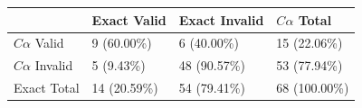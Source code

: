 \begin{tabular}{llll}
\toprule
 & Exact Valid & Exact Invalid & $C\alpha$ Total \\
\midrule
$C\alpha$ Valid & 9 (60.00\%) & 6 (40.00\%) & 15 (22.06\%) \\
$C\alpha$ Invalid & 5 (9.43\%) & 48 (90.57\%) & 53 (77.94\%) \\
Exact Total & 14 (20.59\%) & 54 (79.41\%) & 68 (100.00\%) \\
\bottomrule
\end{tabular}
